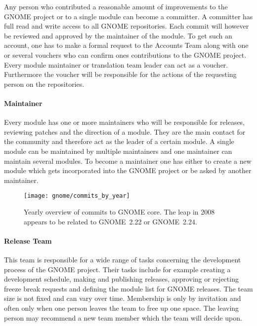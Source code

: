 Any person who contributed a reasonable amount of improvements to the GNOME
project or to a single module can become a committer. A committer has full read
and write access to all GNOME repositories. Each commit will however be
reviewed and approved by the maintainer of the module. To get such an account,
one has to make a formal request to the Accounts Team along with one or several
vouchers who can confirm ones contributions to the GNOME project. Every module
maintainer or translation team leader can act as a voucher. Furthermore the
voucher will be responsible for the actions of the requesting person on the
repositories.

\paragraph{Maintainer}

Every module has one or more maintainers who will be responsible for releases,
reviewing patches and the direction of a module. They are the main contact for
the community and therefore act as the leader of a certain module. A single
module can be maintained by multiple maintainers and one maintainer can
maintain several modules. To become a maintainer one has either to create a new
module which gets incorporated into the GNOME project or be asked by another
maintainer.

\begin{figure}[htbp]
  \centering
  \texttt{[image: gnome/commits\_by\_year]}
  \caption[Commits by year, GNOME]
  {Yearly overview of commits to GNOME core. The leap in 2008 appears to be
    related to GNOME~2.22 or GNOME~2.24.}
\end{figure}

\paragraph{Release Team}

This team is responsible for a wide range of tasks concerning the development
process of the GNOME project. Their tasks include for example creating a
development schedule, making and publishing releases, approving or rejecting
freeze break requests and defining the module list for GNOME releases. The team
size is not fixed and can vary over time. Membership is only by invitation and
often only when one person leaves the team to free up one space. The leaving
person may recommend a new team member which the team will decide upon.

